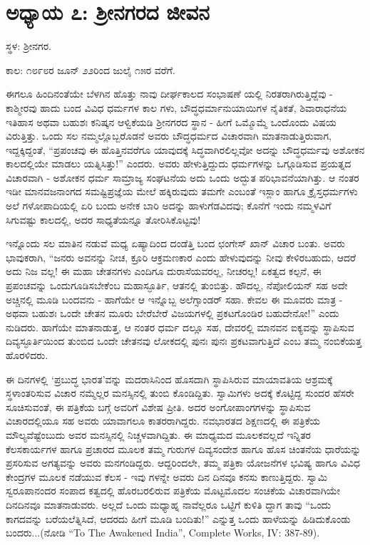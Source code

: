 
\chapter{ಅಧ್ಯಾಯ ೭: ಶ‍್ರೀನಗರದ ಜೀವನ}

ಸ್ಥಳ: ಶ‍್ರೀನಗರ.

ಕಾಲ: ೧೮೯೮ರ ಜೂನ್ ೨೨ರಿಂದ ಜುಲೈ ೧೫ರ ವರೆಗೆ.

ಈಗಲೂ ಹಿಂದಿನಂತೆಯೇ ಬೆಳಗಿನ ಹೊತ್ತು ನಾವು ದೀರ್ಘಕಾಲದ ಸಂಭಾಷಣೆ ಯಲ್ಲಿ ನಿರತರಾಗಿರುತ್ತಿದ್ದೆವು - ಕಾಶ್ಮೀರವು ಹಾದು ಬಂದ ವಿವಿಧ ಧರ್ಮಗಳ ಕಾಲ ಗಳು, ಬೌದ್ಧಧರ್ಮಾನುಯಾಯಿಗಳ ನೈತಿಕತೆ, ಶಿವಾರಾಧನೆಯ ಇತಿಹಾಸ ಅಥವಾ ಬಹುಶಃ ಕನಿಷ್ಕನ ಆಳ್ವಿಕೆಯಡಿ ಶ‍್ರೀನಗರದ ಸ್ಥಾನ - ಹೀಗೆ ಒಮ್ಮೊಮ್ಮೆ ಒಂದೊಂದು ವಿಷಯ ವಿರುತ್ತಿತ್ತು. ಒಂದು ಸಲ ನಮ್ಮಲ್ಲೊಬ್ಬರೊಡನೆ ಅವರು ಬೌದ್ಧಧರ್ಮದ ವಿಚಾರವಾಗಿ ಮಾತನಾಡುತ್ತಿರುವಾಗ, ಇದ್ದಕ್ಕಿದ್ದಂತೆ, “ಪ್ರಪಂಚವು ಈ ಹೊತ್ತಿನವರೆಗೂ ಯಾವುದಕ್ಕೆ ಸಿದ್ಧವಾಗಿರಲಿಲ್ಲವೋ ಅದನ್ನು ಬೌದ್ಧಧರ್ಮವು ಅಶೋಕನ ಕಾಲದಲ್ಲಿಯೇ ಮಾಡಲು ಯತ್ನಿಸಿತ್ತು!” ಎಂದರು. ಅವರು ಹೇಳುತ್ತಿದ್ದುದು ಧರ್ಮಗಳನ್ನು ಒಗ್ಗೂಡಿಸುವ ಪ್ರಯತ್ನದ ವಿಚಾರವಾಗಿ - ಅಶೋಕನ ಧರ್ಮ ಸಾಮ್ರಾಜ್ಯ ಸಂಘಟನೆಯ ಅದು ಒಂದು ಅದ್ಭುತ ಪರಿಭಾವನೆಯಾಗಿತ್ತು. ಆ ನಂತರ ಇಡೀ ಮಾನವಜನಾಂಗದ ಸಮಷ್ಟಿಪ್ರಜ್ಞೆಯ ಮೇಲೆ ಹಕ್ಕಿರುವುದು ತಮಗೇ ಎಂಬಂತೆ ಇಸ್ಲಾಂ ಹಾಗೂ ಕ್ರೈಸ್ತಧರ್ಮಗಳು ಅಲೆ ಗಳೋಪಾದಿಯಲ್ಲಿ ಏರಿ ಬಂದು ಅನೇಕ ಬಾರಿ ಅದನ್ನು ಹಾಳುಗೆಡವಿದವು; ಕೊನೆಗೆ ಇಂದು ನಮ್ಮಳವಿಗೆ ಸಿಗುವಷ್ಟು ಕಾಲದಲ್ಲಿ, ಅದರ ಸಾಧ್ಯತೆಯನ್ನೂ ತೋರಿಸಿಕೊಟ್ಟವು!

ಇನ್ನೊಂದು ಸಲ ಮಾತಿನ ನಡುವೆ ಮಧ್ಯ ಏಷ್ಯಾದಿಂದ ದಂಡೆತ್ತಿ ಬಂದ ಛಂಗೇಸ್ ಖಾನ್ ವಿಚಾರ ಬಂತು. ಅವರು ಭಾವುಕರಾಗಿ, “ಜನರು ಅವನನ್ನು ನೀಚ, ಕ್ರೂರಿ ಆಕ್ರಮಣಕಾರ ಎಂದು ಹೇಳುವುದನ್ನು ನೀವು ಕೇಳಿರಬಹುದು, ಆದರೆ ಅದು ನಿಜ ವಲ್ಲ! ಈ ಮಹಾ ಚೇತನಗಳು ಎಂದಿಗೂ ದುರಾಸೆಯವರಲ್ಲ, ನೀಚರಲ್ಲ! ಏಕತ್ವದ ಕಲ್ಪನೆ, ಈ ಪ್ರಪಂಚವನ್ನು ಒಂದುಗೂಡಿಸಬೇಕೆಂಬ ಮಹಾಸ್ಫೂರ್ತಿ, ಆತನಲ್ಲಿ ತುಂಬಿತ್ತು. ಹೌದಲ್ಲ, ನೆಪೋಲಿಯನ್ ಸಹ ಅದೇ ಅಚ್ಚಿನಲ್ಲಿ ಮೂಡಿ ಬಂದವನು - ಹಾಗೆಯೇ ಆ ಇನ್ನೊಬ್ಬ ಅಲೆಗ್ಸಾಂಡರ್ ಸಹಾ. ಕೇವಲ ಈ ಮೂವರು ಮಾತ್ರ - ಅಥವಾ ಬಹುಶಃ ಒಂದೇ ಚೇತನ ಮೂರು ಬೇರೆಬೇರೆ ವಿಜಯಗಳಲ್ಲಿ ಪ್ರಕಟಗೊಂಡಿರ ಬಹುದೇನೋ!” ಎಂದು ನುಡಿದರು. ಹಾಗೆಯೇ ಮಾತನಾಡುತ್ತ, ಆ ನಂತರ ಧರ್ಮ ದಲ್ಲೂ ಸಹ, ದೇವರಲ್ಲಿ ಮಾನವನ ಐಕ್ಯವನ್ನು ಸ್ಥಾಪಿಸುವ ದಿವ್ಯಸ್ಫೂರ್ತಿಯಿಂದ ತುಂಬಿದ ಒಂದೇ ಚೇತನವು ಲೋಕದಲ್ಲಿ ಪುನಃ ಪುನಃ ಪ್ರಕಟವಾಗುತ್ತಿದೆ ಎಂಬ ತಮ್ಮ ನಂಬಿಕೆಯತ್ತ ಹೊರಳಿದರು.

ಈ ದಿನಗಳಲ್ಲಿ ‘ಪ್ರಬುದ್ಧ ಭಾರತ’ವನ್ನು ಮದರಾಸಿನಿಂದ ಹೊಸದಾಗಿ ಸ್ಥಾಪಿಸಿರುವ ಮಾಯಾವತಿಯ ಆಶ್ರಮಕ್ಕೆ ಸ್ಥಳಾಂತರಿಸುವ ವಿಚಾರ ನಮ್ಮೆಲ್ಲರ ಮನಸ್ಸಿನಲ್ಲಿ ತುಂಬಿ ಕೊಂಡಿದ್ದಿತು. ಸ್ವಾಮಿಗಳು ಅದಕ್ಕೆ ಕೊಟ್ಟಿದ್ದ ಸುಂದರ ಹೆಸರೇ ಸೂಚಿಸುವಂತೆ, ಈ ಪತ್ರಿಕೆಯ ಬಗ್ಗೆ ಅವರಿಗೆ ವಿಶೇಷ ಪ್ರೀತಿ. ಅದರ ಅಂಗೋಪಾಂಗಗಳನ್ನು ಸ್ಥಾಪಿಸುವ ವಿಚಾರದಲ್ಲಿಯೂ ಸಹ ಅವರು ಯಾವಾಗಲೂ ಕಾತರರಾಗಿದ್ದರು. ನವಭಾರತದ ಶಿಕ್ಷಣದಲ್ಲಿ ಈ ಪತ್ರಿಕೆಯ ಮೌಲ್ಯವೆಷ್ಟೆಂಬುದು ಅವರ ಮನಸ್ಸಿನಲ್ಲಿ ನಿಚ್ಚಳವಾಗಿದ್ದಿತು. ಈ ಮಾಧ್ಯಮದ ಮೂಲಕವಲ್ಲದೆ ಇನ್ನಿತರ ಕೆಲಸಕಾರ್ಯಗಳ ಹಾಗೂ ಪ್ರಚಾರದ ಮೂಲಕ ತಮ್ಮ ಗುರುಗಳ ದಿವ್ಯಸಂದೇಶ ಹಾಗೂ ಹೊಸ ಚಿಂತನೆಯ ಧಾರೆಯನ್ನು ಪ್ರಸರಿಸುವ ಅಗತ್ಯವನ್ನು ಅವರು ಮನಗಂಡಿದ್ದರು. ಆದ್ದರಿಂದಲೇ, ತಮ್ಮ ಪತ್ರಿಕಾ ಯೋಜನೆಗಳ ಭವಿಷ್ಯ ಹಾಗೂ ವಿವಿಧ ಕೇಂದ್ರಗಳ ಮೂಲಕ ನಡೆಯುವ ಕೆಲಸ - ಇವು ಗಳನ್ನೇ ಅವರು ದಿನ ದಿನವೂ ಕನಸು ಕಾಣುತ್ತಿದ್ದರು. ಸ್ವಾಮಿ ಸ್ವರೂಪಾನಂದರ ಸಂಪಾದ ಕತ್ವದಲ್ಲಿ ಹೊರಬರಲಿರುವ ಪತ್ರಿಕೆಯ ಮೊಟ್ಟಮೊದಲ ಸಂಚಿಕೆಯ ವಿಚಾರವಾಗಿಯೇ ದಿನದಿನವೂ ಮಾತನಾಡುವರು. ಅಲ್ಲದೆ ಒಂದು ಮಧ್ಯಾಹ್ನ ನಾವೆಲ್ಲರೂ ಒಟ್ಟಿಗೆ ಕುಳಿತಿ ದ್ದಾಗ ತಾವು “ಒಂದು ಕಾಗದವನ್ನು ಬರೆಯಲೆತ್ನಿಸಿದೆ, ಆದರದು ಹೀಗೆ ಮೂಡಿ ಬಂದಿತು!” ಎನ್ನುತ್ತ ಒಂದು ಹಾಳೆಯನ್ನು ಹಿಡಿದುಕೊಂಡು ಬಂದರು...(ನೋಡಿ “To The Awakened India”, Complete Works, IV: 387-89).

